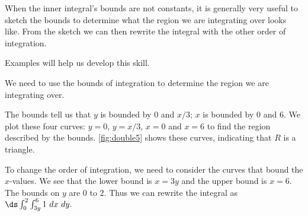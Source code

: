 When the inner integral's bounds are not constants, it is generally very useful to sketch the bounds to determine what the region we are integrating over looks like. From the sketch we can then rewrite the integral with the other order of integration.

Examples will help us develop this skill.

{We need to use the bounds of integration to determine the region we are integrating over. %

The bounds tell us that $y$ is bounded by $0$ and $x/3$; $x$ is bounded by 0 and 6. We plot these four curves: $y=0$, $y=x/3$, $x=0$ and $x=6$ to find the region described by the bounds. \autoref{fig:double5} shows these curves, indicating that $R$ is a triangle.


To change the order of integration, we need to consider the curves that bound the $x$-values. We see that the lower bound is $x=3y$ and the upper bound is $x=6$. The bounds on $y$ are $0$ to $2$. Thus we can rewrite the integral as 
$\ds \int_0^2\int_{3y}^6 1\ dx \ dy.$}

